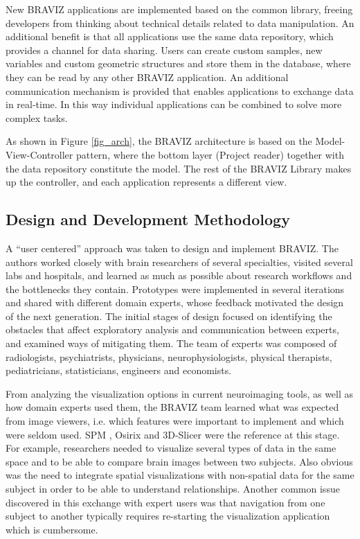 \documentclass{frontiersHLTH}
\begin{document}
New BRAVIZ applications are implemented based on the common library, freeing developers from thinking about technical details related to data manipulation. An additional benefit is that all applications use the same data repository, which provides a channel for data sharing. Users can create custom samples, new variables and custom geometric structures and store them in the database, where they can be read by any other BRAVIZ application. An additional communication mechanism is provided that enables applications to exchange data in real-time. In this way individual applications can be combined to solve more complex tasks.


As shown in Figure \ref{fig_arch}, the BRAVIZ architecture is based on the Model-View-Controller pattern, where the bottom layer (Project reader) together with the data repository constitute the model. The rest of the BRAVIZ Library makes up the controller, and each application represents a different view.

\subsection{Design and Development Methodology}

A ``user centered'' approach \cite{wassink_applying_2009} was taken to design and implement BRAVIZ. The authors worked closely with brain researchers of several specialties, visited several labs and hospitals, and learned as much as possible about research workflows and the bottlenecks they contain. Prototypes were implemented in several iterations and shared with different domain experts, whose feedback motivated the design of the next generation.
The initial stages of design focused on identifying the obstacles that affect exploratory analysis and communication between experts, and examined ways of mitigating them. The team of experts was composed of radiologists, psychiatrists, physicians, neurophysiologists, physical therapists, pediatricians, statisticians, engineers and economists.

From analyzing the visualization options in current neuroimaging tools, as well as how domain experts used them, the BRAVIZ team learned what was expected from image viewers, i.e. which features were important to implement and which were seldom used. SPM \cite{friston_statistical_2007}, Osirix \cite{rosset_osirix:_2004} and 3D-Slicer \cite{fedorov_3d_2012} were the reference at this stage. For example, researchers needed to visualize several types of data in the same space and to be able to compare brain images between two subjects. Also obvious was the need to integrate spatial visualizations with non-spatial data for the same subject in order to be able to understand relationships. Another common issue discovered in this exchange with expert users was that navigation from one subject to another typically requires re-starting the visualization application which is cumbersome. 
\end{document}
